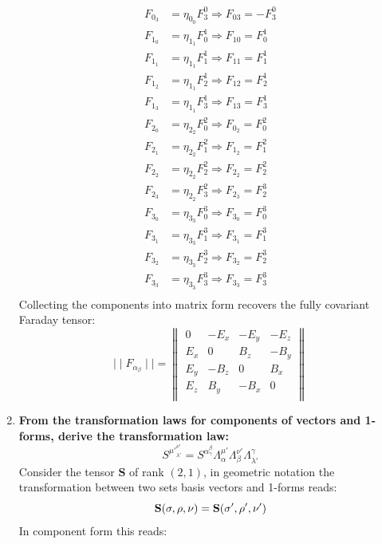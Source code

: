 \documentclass[9pt]{report}
\begin{document}
\begin{enumerate}
\[\begin{align}
        F_0_3 &= \eta_0_0 F_3^0 \Rightarrow F_{03} = -F^0_3\\
        F_1_0 &= \eta_1_1 F_0^1 \Rightarrow F_{10} = F_0^1\\
        F_1_1 &= \eta_1_1 F_1^1 \Rightarrow F_{11} = F_1^1\\
        F_1_2 &= \eta_1_1 F_2^1 \Rightarrow F_{12} = F_2^1 \\
        F_1_3 &= \eta_1_1 F_3^1 \Rightarrow F_{13} = F_3^1 \\
        F_2_0 &= \eta_2_2 F_0^2 \Rightarrow F_0_2 = F_0^2 \\
        F_2_1 &= \eta_2_2 F_1^2 \Rightarrow F_1_2 = F_1^2\\
        F_2_2 &= \eta_2_2 F_2^2 \Rightarrow F_2_2 = F_2^2\\
        F_2_3 &= \eta_2_2 F_3^2 \Rightarrow F_2_3 = F_2^3 \\
        F_3_0 &= \eta_3_3 F_0^3 \Rightarrow F_3_0 = F_0^3\\
        F_3_1 &= \eta_3_3 F_1^3 \Rightarrow F_3_1 = F_1^3\\
        F_3_2 &= \eta_3_3 F_2^3 \Rightarrow F_3_2 = F_2^3\\
        F_3_3 &= \eta_3_3 F_3^3 \Rightarrow F_3_3 = F_3^3\\
      \end{align}
    \]
    Collecting the components into matrix form recovers the fully covariant
    Faraday tensor:
    \begin{equation}
       \mid  \mid F_\alpha_\beta  \mid \mid =
       \begin{Vmatrix}
         0 & -E_x & -E_y & -E_z\\
         E_x & 0 & B_z & -B_y\\
         E_y & -B_z & 0 & B_x\\
         E_z & B_y & -B_x & 0\\
       \end{Vmatrix}
     \end{equation}
\item \textbf{From the transformation laws for components of vectors and 1-forms,
  derive the transformation law:}
  \[
    S^{\mu'}^{\nu'}_{\lambda'} = S^\alpha^\beta_\gamma \Lambda^{\mu'}_\alpha \Lambda^{\nu'}_\beta \Lambda^\gamma_{\lambda'}
  \]
  Consider the tensor $\textbf{S}$ of rank $(2, 1)$, in geometric notation the transformation between
  two sets basis vectors and 1-forms reads:
  \[
  \textbf{S}(\bf{\sigma}, \bf{\rho}, \bf{\nu}) =
  \textbf{S}(\bf{\sigma'}, \bf{\rho'}, \bf{\nu'})
  \]
  In component form this reads:

\end{enumerate}
\end{document}
